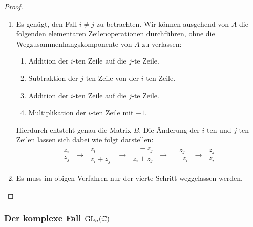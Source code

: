 \begin{proof}
\begin{enumerate}[label = \alph*)]
    \item
      Es genügt, den Fall $i \neq j$ zu betrachten.
      Wir können ausgehend von $A$ die folgenden elementaren Zeilenoperationen durchführen, ohne die Wegzusammenhangskomponente von $A$ zu verlassen:
      \begin{enumerate}[label = \arabic*.]
        \item
          Addition der $i$-ten Zeile auf die $j$-te Zeile.
        \item
          Subtraktion der $j$-ten Zeile von der $i$-ten Zeile.
        \item
          Addition der $i$-ten Zeile auf die $j$-te Zeile.
        \item
          Multiplikation der $i$-ten Zeile mit $-1$.
      \end{enumerate}
      Hierdurch entsteht genau die Matrix $B$.
      Die Änderung der $i$-ten und $j$-ten Zeilen lassen  sich dabei wie folgt darstellen:
      \[
        \begin{matrix}
          z_i \\ z_j
        \end{matrix}
        \;\to\;
        \begin{matrix}
          z_i \phantom{\ + z_j} \\ z_i + z_j
        \end{matrix}
        \;\to\;
        \begin{matrix}
          \phantom{z_i} - z_j \\ z_i + z_j
        \end{matrix}
        \;\to\;
        \begin{matrix}
          -z_j \\ \phantom{-}z_i
        \end{matrix}
        \;\to\;
        \begin{matrix}
          z_j \\ z_i
        \end{matrix}
      \]
      
    \item
      Es muss im obigen Verfahren nur der vierte Schritt weggelassen werden.
    \qedhere
  \end{enumerate}
\end{proof}





\subsubsection{Der komplexe Fall \texorpdfstring{$\operatorname{GL}_{n}(\mathbb{C})$}{GLn(C)}}

